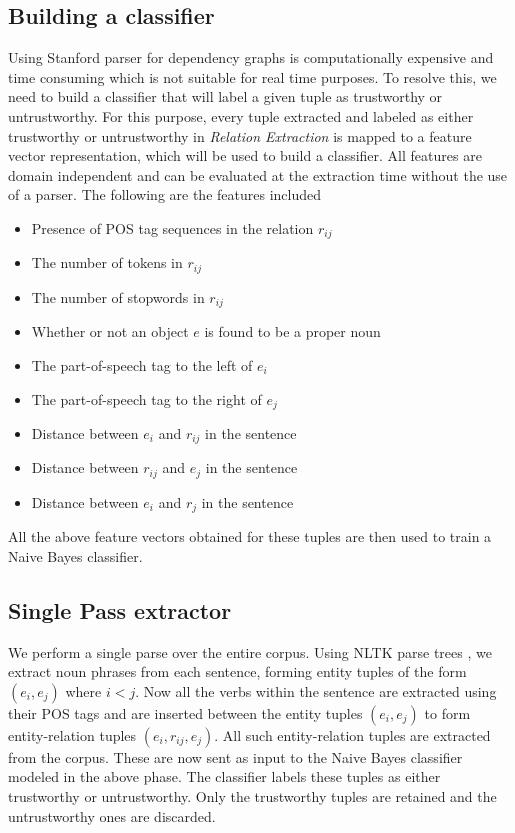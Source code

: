 \documentclass{article}
\begin{document}
\subsection{Building a classifier}
Using Stanford parser for dependency graphs is computationally expensive and time consuming which is not suitable for real time purposes. To resolve this, we need to build a classifier that will label a given tuple as trustworthy or untrustworthy. For this purpose, every tuple extracted and labeled as either trustworthy or untrustworthy in  \textit{Relation Extraction} is mapped to a feature vector representation, which will be used to build a classifier. All features are domain independent and can be evaluated at the extraction time without the use of a parser. The following are the features included
\begin{itemize}
\setlength\itemsep{0.05 em}
\item Presence of POS tag sequences in the relation $r_{ij}$
\item The number of tokens in $r_{ij}$
\item The number of stopwords in $r_{ij}$
\item Whether or not an object $e$ is found to be a proper noun
\item The part-of-speech tag to the left of $e_i$
\item The part-of-speech tag to the right of $e_j$
\item Distance between $e_i$ and $r_{ij}$ in the sentence
\item Distance between $r_{ij}$ and $e_{j}$ in the sentence
\item Distance between $e_i$ and $r_j$ in the sentence
\end{itemize}

All the above feature vectors obtained for these tuples are then used to train a Naive Bayes classifier.

\subsection{Single Pass extractor}

We perform a single parse over the entire corpus. Using NLTK parse trees \cite{Tree}, we extract noun phrases from each sentence, forming entity tuples of the form $(e_i, e_j)$ where $i < j$. Now all the verbs within the sentence are extracted using their POS tags and are inserted between the entity tuples $(e_i, e_j)$ to form entity-relation tuples $(e_i, r_{ij}, e_j)$. All such entity-relation tuples are extracted from the corpus. These are now sent as input to the Naive Bayes classifier modeled in the above phase. The classifier labels these tuples as either trustworthy or untrustworthy. Only the trustworthy tuples are retained and the untrustworthy ones are discarded. 
\end{document}
